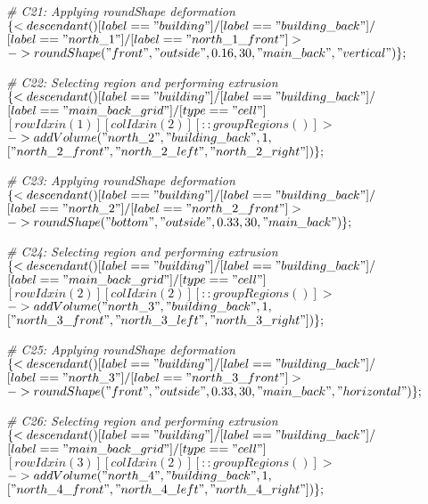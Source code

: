 \noindent \textit{\# C21: Applying roundShape deformation}\\
$\{< descendant() [label=="building"] / [label=="building\_back"] / $\\
$[label=="north\_1"] / [label=="north\_1\_front"] > $\\
$-> roundShape("front", "outside", 0.16, 30, "main\_back", "vertical")\};$

\noindent \textit{\# C22: Selecting region and performing extrusion}\\
$\{< descendant() [label=="building"] / [label=="building\_back"] / $\\
$[label=="main\_back\_grid"] / [type=="cell"] $\\
$[rowIdx in (1)] [colIdx in (2)] [::groupRegions()] > $\\
$-> addVolume("north\_2", "building\_back", 1, $\\
$["north\_2\_front", "north\_2\_left", "north\_2\_right"])\};$

\noindent \textit{\# C23: Applying roundShape deformation}\\
$\{< descendant() [label=="building"] / [label=="building\_back"] / $\\
$[label=="north\_2"] / [label=="north\_2\_front"] > $\\
$-> roundShape("bottom", "outside", 0.33, 30, "main\_back")\};$

\noindent \textit{\# C24: Selecting region and performing extrusion}\\
$\{< descendant() [label=="building"] / [label=="building\_back"] / $\\
$[label=="main\_back\_grid"] / [type=="cell"] $\\
$[rowIdx in (2)] [colIdx in (2)] [::groupRegions()] > $\\
$-> addVolume("north\_3", "building\_back", 1, $\\
$["north\_3\_front", "north\_3\_left", "north\_3\_right"])\};$

\noindent \textit{\# C25: Applying roundShape deformation}\\
$\{< descendant() [label=="building"] / [label=="building\_back"] / $\\
$[label=="north\_3"] / [label=="north\_3\_front"] > $\\
$-> roundShape("front", "outside", 0.33, 30, "main\_back", "horizontal")\};$

\noindent \textit{\# C26: Selecting region and performing extrusion}\\
$\{< descendant() [label=="building"] / [label=="building\_back"] / $\\
$[label=="main\_back\_grid"] / [type=="cell"] $\\
$[rowIdx in (3)] [colIdx in (2)] [::groupRegions()] > $\\
$-> addVolume("north\_4", "building\_back", 1, $\\
$["north\_4\_front", "north\_4\_left", "north\_4\_right"])\};$

